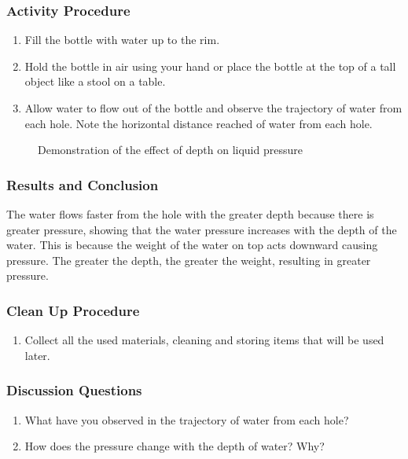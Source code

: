 \subsubsection*{Activity Procedure}
\begin{enumerate}
\item{Fill the bottle with water up to the rim.} 
\item{Hold the bottle in air using your hand or place the bottle at the top of a tall object like a stool on a table.} 
\item{Allow water to flow out of the bottle and observe the trajectory of water from each hole. Note the horizontal distance reached of water from each hole.} 
\end{enumerate}

\begin{figure}
\begin{center}
\def\svgwidth{250pt}

\caption{Demonstration of the effect of depth on liquid pressure}
\label{fig:pressure-liquid}
\end{center}
\end{figure}

\subsubsection*{Results and Conclusion}
The water flows faster from the hole with the greater depth because there is greater pressure, showing that the water pressure increases with the depth of the water. This is because the weight of the water on top acts downward causing pressure. The greater the depth, the greater the weight, resulting in greater pressure. 

\subsubsection*{Clean Up Procedure}
\begin{enumerate}
\item{Collect all the used materials, cleaning and storing items that will be used later. } 
\end{enumerate}

\subsubsection*{Discussion Questions}
\begin{enumerate}
\item{What have you observed in the trajectory of water from each hole?}
\item{How does the pressure change with the depth of water? Why?}
\end{enumerate}

